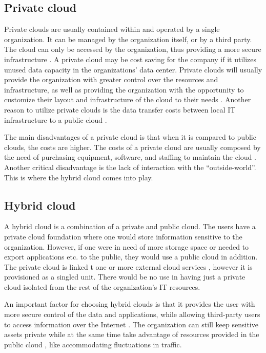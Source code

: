 \subsection{Private cloud}
Private clouds are usually contained within and operated by a single organization. It can be managed by the organization itself, or by a third party. The cloud can only be accessed by the organization, thus providing a more secure infrastructure \cite{GoyalSumit}. A private cloud may be cost saving for the company if it utilizes unused data capacity in the organizations' data center. Private clouds will usually provide the organization with greater control over the resources and infrastructure, as well as providing the organization with the opportunity to customize their layout and infrastructure of the cloud to their needs \cite{IBM}. 
Another reason to utilize private clouds is the data transfer costs between local IT infrastructure to a public cloud \cite{DillonWuChang}.

The main disadvantages of a private cloud is that when it is compared to public clouds, the costs are higher. The costs of a private cloud are usually composed by the need of purchasing equipment, software, and staffing to maintain the cloud \cite{GoyalSumit}. Another critical disadvantage is the lack of interaction with the \enquote{outside-world}. This is where the hybrid cloud comes into play.

\subsection{Hybrid cloud}
A hybrid cloud is a combination of a private and public cloud. The users have a private cloud foundation \cite{IBM} where one would store information sensitive to the organization. However, if one were in need of more storage space or needed to export applications etc. to the public, they would use a public cloud in addition. The private cloud is linked t one or more external cloud services \cite{Ramgovind}, however it is provisioned as a singled unit. There would be no use in having just a private cloud isolated from the rest of the organization's IT resources. 

An important factor for choosing hybrid clouds is that it provides the user with more secure control of the data and applications, while allowing third-party users to access information over the Internet \cite{Ramgovind}. The organization can still keep sensitive assets private while at the same time take advantage of resources provided in the public cloud \cite{Azure}, like accommodating fluctuations in traffic.



